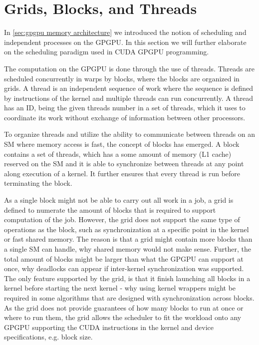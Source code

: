 \section{Grids, Blocks, and Threads}
\label{sec:grids blocks threads}

In \cref{sec:gpgpu memory architecture} we introduced the notion of scheduling and independent processes on the GPGPU.
In this section we will further elaborate on the scheduling paradigm used in CUDA GPGPU programming.

The computation on the GPGPU is done through the use of threads.
Threads are scheduled concurrently in warps by blocks, where the blocks are organized in grids.
A thread is an independent sequence of work where the sequence is defined by instructions of the kernel and multiple threads can run concurrently.
A thread has an ID, being the given threads number in a set of threads, which it uses to coordinate its work without exchange of information between other processors.

To organize threads and utilize the ability to communicate between threads on an SM where memory access is fast, the concept of blocks has emerged.
A block contains a set of threads, which has a some amount of memory (L1 cache) reserved on the SM and it is able to synchronize between threads at any point along execution of a kernel.
It further ensures that every thread is run before terminating the block.

As a single block might not be able to carry out all work in a job, a grid is defined to numerate the amount of blocks that is required to support computation of the job.
However, the grid does not support the same type of operations as the block, such as synchronization at a specific point in the kernel or fast shared memory.
The reason is that a grid might contain more blocks than a single SM can handle, why shared memory would not make sense.
Further, the total amount of blocks might be larger than what the GPGPU can support at once, why deadlocks can appear if inter-kernel synchronization was supported.
The only feature supported by the grid, is that it finish launching all blocks in a kernel before starting the next kernel - why using kernel wrappers might be required in some algorithms that are designed with synchronization across blocks.
As the grid does not provide guarantees of how many blocks to run at once or where to run them, the grid allows the scheduler to fit the workload onto any GPGPU supporting the CUDA instructions in the kernel and device specifications, e.g. block size.

